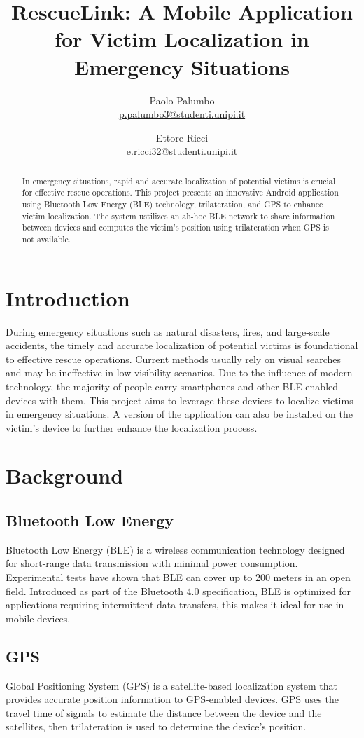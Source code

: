 \documentclass{article}
\title{RescueLink: A Mobile Application for Victim Localization in Emergency Situations}
\author{
    Paolo Palumbo \\ 
    \href{mailto:p.palumbo3@studenti.unipi.it}
        {p.palumbo3@studenti.unipi.it}
    \and Ettore Ricci \\ 
    \href{mailto:e.ricci32@studenti.unipi.it}
        {e.ricci32@studenti.unipi.it}}
\begin{document}
\maketitle
\begin{abstract}
In emergency situations, rapid
and accurate localization of potential 
victims is crucial for effective rescue operations.
This project presents an innovative Android 
application using Bluetooth Low Energy (BLE) 
technology, trilateration, and GPS to enhance 
victim localization. 
The system ustilizes an ah-hoc BLE network
to share information between devices and 
computes the victim's position using trilateration 
when GPS is not available.
\end{abstract}
\begin{multicols}{2}
\section{Introduction}
During emergency situations such as natural 
disasters, fires, and large-scale accidents, 
the timely and accurate localization of 
potential victims is foundational to effective
rescue operations. 
Current methods usually rely on visual searches
and may be ineffective in low-visibility scenarios.
Due to the influence of modern technology, 
the majority of people carry smartphones and other
BLE-enabled devices with them. 
This project aims to leverage these devices to
localize victims in emergency situations.
A version of the application can also be installed
on the victim's device to further enhance the
localization process.
\section{Background}
\subsection{Bluetooth Low Energy}
Bluetooth Low Energy (BLE) is a wireless 
communication technology designed for short-range
data transmission with minimal power consumption. 
Experimental tests have shown that BLE can cover 
up to 200 meters in an open 
field\cite{Lodeiro_Santiago_2017}.
Introduced as part of the Bluetooth 4.0 
specification, BLE is optimized for applications 
requiring intermittent data transfers, this makes
it ideal for use in mobile devices.
\subsection{GPS}
Global Positioning System (GPS) is a 
satellite-based localization system that
provides accurate position information
to GPS-enabled devices.
GPS uses the travel time of signals to estimate
the distance between the device and the satellites, 
then trilateration is used to determine the 
device's position.

\end{multicols}
\end{document}
